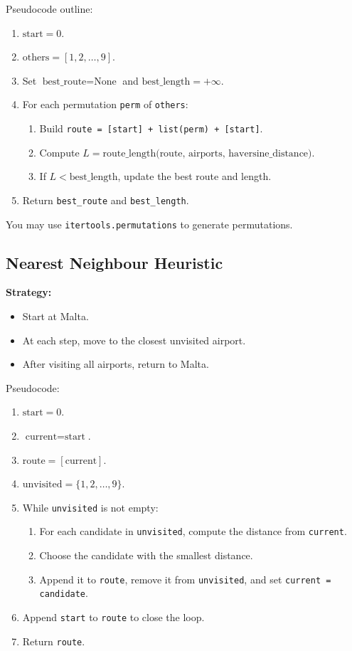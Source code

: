 \documentclass[11pt]{article}
\begin{document}
Pseudocode outline:
\begin{enumerate}
    \item $\text{start} = 0$.
    \item $\text{others} = [1,2,\dots,9]$.
    \item Set $\text{best\_route} = \text{None}$ and $\text{best\_length} = +\infty$.
    \item For each permutation \texttt{perm} of \texttt{others}:
    \begin{enumerate}
        \item Build \texttt{route = [start] + list(perm) + [start]}.
        \item Compute $L = \text{route\_length(route, airports, haversine\_distance)}$.
        \item If $L < \text{best\_length}$, update the best route and length.
    \end{enumerate}
    \item Return \texttt{best\_route} and \texttt{best\_length}.
\end{enumerate}

You may use \texttt{itertools.permutations} to generate permutations.

\subsection{Nearest Neighbour Heuristic}
\textbf{Strategy:}
\begin{itemize}
    \item Start at Malta.
    \item At each step, move to the closest unvisited airport.
    \item After visiting all airports, return to Malta.
\end{itemize}

Pseudocode:
\begin{enumerate}
    \item $\text{start} = 0$.
    \item $\text{current} = \text{start}$.
    \item $\text{route} = [\text{current}]$.
    \item $\text{unvisited} = \{1,2,\dots,9\}$.
    \item While \texttt{unvisited} is not empty:
    \begin{enumerate}
        \item For each candidate in \texttt{unvisited}, compute the distance from \texttt{current}.
        \item Choose the candidate with the smallest distance.
        \item Append it to \texttt{route}, remove it from \texttt{unvisited}, and set \texttt{current = candidate}.
    \end{enumerate}
    \item Append \texttt{start} to \texttt{route} to close the loop.
    \item Return \texttt{route}.
\end{enumerate}
\end{document}
